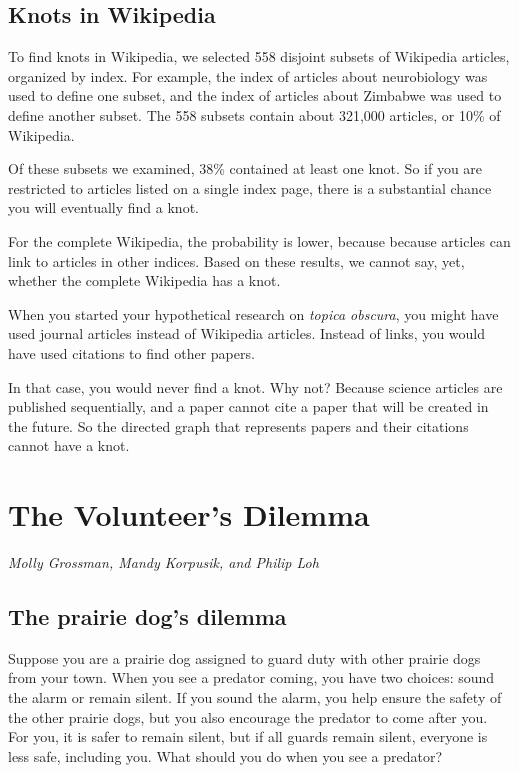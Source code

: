 \documentclass[10pt]{book}
\begin{document}
\section{Knots in Wikipedia}

To find knots in Wikipedia, we selected 558 disjoint subsets of
Wikipedia articles, organized by index. For example, the index of
articles about neurobiology was used to define one subset, and the
index of articles about Zimbabwe was used to define another
subset. The 558 subsets contain about 321,000 articles, or
10\% of Wikipedia.

Of these subsets we examined, 38\% contained at least one knot. So if
you are restricted to articles listed on a single index page, there is
a substantial chance you will eventually find a knot.

For the complete Wikipedia, the probability is lower, because
because articles can link to articles in other indices.  Based on
these results, we cannot say, yet, whether the complete Wikipedia
has a knot.


When you started your hypothetical research on \emph{topica obscura},
you might have used journal articles instead of Wikipedia articles.
Instead of links, you would have used citations to find other papers.

In that case, you would never find a knot.  Why not? 
Because science articles are
published sequentially, and a paper cannot cite a paper that will be
created in the future.  So the directed graph that represents papers
and their citations cannot have a knot.



\chapter{The Volunteer's Dilemma}

{\em Molly Grossman, Mandy Korpusik, and Philip Loh}


\section{The prairie dog's dilemma}

Suppose you are a prairie dog assigned to guard duty with other
prairie dogs from your town.  When you see a predator coming, you have
two choices: sound the alarm or remain silent.  If you sound the
alarm, you help ensure the safety of the other prairie dogs, but you
also encourage the predator to come after you.  For you, it is safer
to remain silent, but if all guards remain silent, everyone is less
safe, including you.  What should you do when you see a predator?
\end{document}

